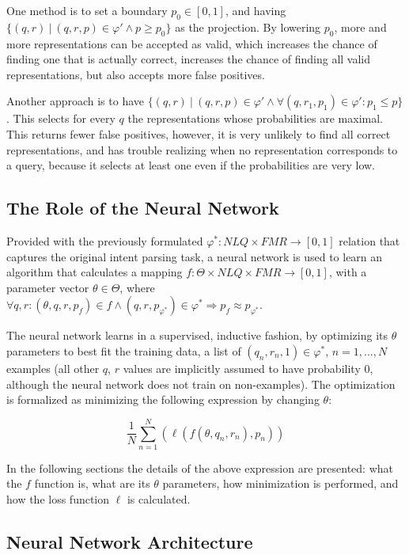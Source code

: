 \documentclass[12pt]{article}
\begin{document}
One method is to set a boundary $p_{0} \in [0,1]$, and having $\{ (q, r) \ | \ (q,r,p) \in \varphi' \land p \geq p_{0} \}$ as the projection. By lowering $p_{0}$, more and more representations can be accepted as valid, which increases the chance of finding one that is actually correct, increases the chance of finding all valid representations, but also accepts more false positives.

Another approach is to have $\{ (q,r) \ | \ (q,r,p) \in \varphi' \land \forall (q, r_{1}, p_{1}) \in \varphi' : p_{1} \leq p \}$. This selects for every $q$ the representations whose probabilities are maximal. This returns fewer false positives, however, it is very unlikely to find all correct representations, and has trouble realizing when no representation corresponds to a query, because it selects at least one even if the probabilities are very low.

\subsection{The Role of the Neural Network}

Provided with the previously formulated $\varphi^{*} : NLQ \times FMR \to [0,1]$ relation that captures the original intent parsing task, a neural network is used to learn an algorithm that calculates a mapping $f : \Theta \times NLQ \times FMR \to [0,1]$, with a parameter vector $\theta \in \Theta$, where $\forall q, r : (\theta, q, r, p_{f}) \in f \land (q, r, p_{\varphi^{*}}) \in \varphi^{*} \Rightarrow p_{f} \approx p_{\varphi^{*}}$.

The neural network learns in a supervised, inductive fashion, by optimizing its $\theta$ parameters to best fit the training data, a list of $(q_{n}, r_{n}, 1) \in \varphi^{*}$, $n = 1, ..., N$ examples (all other $q$, $r$ values are implicitly assumed to have probability $0$, although the neural network does not train on non-examples). The optimization is formalized as minimizing the following expression by changing $\theta$:

$$\frac{1}{N} \sum_{n = 1}^{N}( \ell(f(\theta, q_{n}, r_{n}), p_{n}) )$$

In the following sections the details of the above expression are presented: what the $f$ function is, what are its $\theta$ parameters, how minimization is performed, and how the loss function $\ell$ is calculated.

\subsection{Neural Network Architecture}
\end{document}
